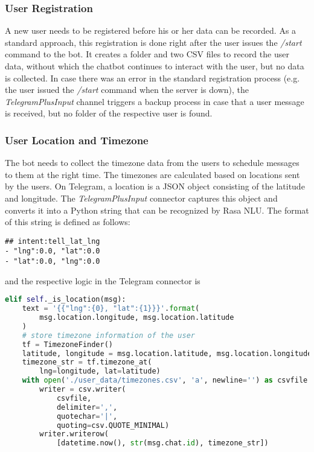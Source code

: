 \subsubsection{User Registration}
A new user needs to be registered before his or her data can be recorded. As a standard approach, this registration is done right after the user issues the \emph{/start} command to the bot. It creates a folder and two CSV files to record the user data, without which the chatbot continues to interact with the user, but no data is collected. In case there was an error in the standard registration process (e.g. the user issued the \emph{/start} command when the server is down), the \emph{TelegramPlusInput} channel triggers a backup process in case that a user message is received, but no folder of the respective user is found.

\subsubsection{User Location and Timezone}
The bot needs to collect the timezone data from the users to schedule messages to them at the right time. The timezones are calculated based on locations sent by the users. On Telegram, a location is a JSON object consisting of the latitude and longitude. The \emph{TelegramPlusInput} connector captures this object and converts it into a Python string that can be recognized by Rasa NLU. The format of this string is defined as follows:

\begin{lstlisting}
## intent:tell_lat_lng
- "lng":0.0, "lat":0.0
- "lat":0.0, "lng":0.0
\end{lstlisting}

\bigskip
and the respective logic in the Telegram connector is

\begin{lstlisting}[language=Python]
elif self._is_location(msg):
    text = '{{"lng":{0}, "lat":{1}}}'.format(
        msg.location.longitude, msg.location.latitude
    )
    # store timezone information of the user
    tf = TimezoneFinder()
    latitude, longitude = msg.location.latitude, msg.location.longitude
    timezone_str = tf.timezone_at(
        lng=longitude, lat=latitude)
    with open('./user_data/timezones.csv', 'a', newline='') as csvfile:
        writer = csv.writer(
            csvfile,
            delimiter=',',
            quotechar='|',
            quoting=csv.QUOTE_MINIMAL)
        writer.writerow(
            [datetime.now(), str(msg.chat.id), timezone_str])
\end{lstlisting}

